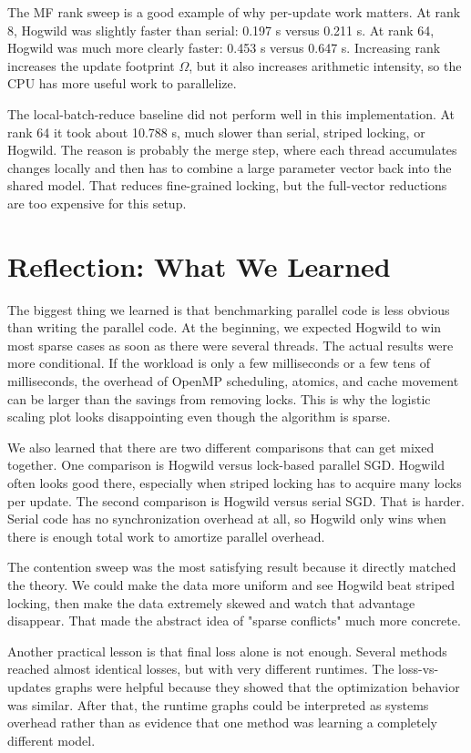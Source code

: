 \documentclass[11pt]{article}
\begin{document}
The MF rank sweep is a good example of why per-update work matters. At rank 8, Hogwild was slightly faster than serial: 0.197 s versus 0.211 s. At rank 64, Hogwild was much more clearly faster: 0.453 s versus 0.647 s. Increasing rank increases the update footprint \(\Omega\), but it also increases arithmetic intensity, so the CPU has more useful work to parallelize.

The local-batch-reduce baseline did not perform well in this implementation. At rank 64 it took about 10.788 s, much slower than serial, striped locking, or Hogwild. The reason is probably the merge step, where each thread accumulates changes locally and then has to combine a large parameter vector back into the shared model. That reduces fine-grained locking, but the full-vector reductions are too expensive for this setup.

\section{Reflection: What We Learned}

The biggest thing we learned is that benchmarking parallel code is less obvious than writing the parallel code. At the beginning, we expected Hogwild to win most sparse cases as soon as there were several threads. The actual results were more conditional. If the workload is only a few milliseconds or a few tens of milliseconds, the overhead of OpenMP scheduling, atomics, and cache movement can be larger than the savings from removing locks. This is why the logistic scaling plot looks disappointing even though the algorithm is sparse.

We also learned that there are two different comparisons that can get mixed together. One comparison is Hogwild versus lock-based parallel SGD. Hogwild often looks good there, especially when striped locking has to acquire many locks per update. The second comparison is Hogwild versus serial SGD. That is harder. Serial code has no synchronization overhead at all, so Hogwild only wins when there is enough total work to amortize parallel overhead.

The contention sweep was the most satisfying result because it directly matched the theory. We could make the data more uniform and see Hogwild beat striped locking, then make the data extremely skewed and watch that advantage disappear. That made the abstract idea of "sparse conflicts" much more concrete.

Another practical lesson is that final loss alone is not enough. Several methods reached almost identical losses, but with very different runtimes. The loss-vs-updates graphs were helpful because they showed that the optimization behavior was similar. After that, the runtime graphs could be interpreted as systems overhead rather than as evidence that one method was learning a completely different model.
\end{document}
